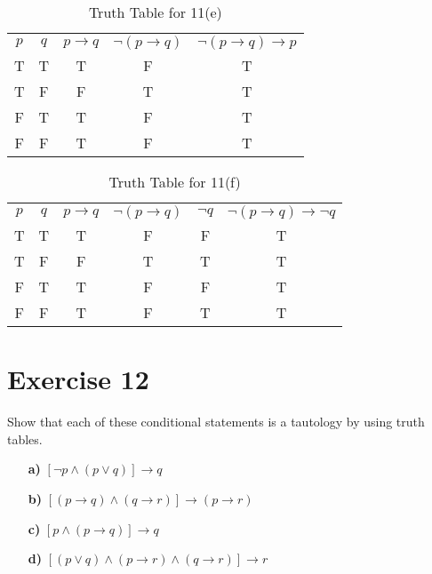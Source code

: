 \documentclass{Axon}
\begin{document}
\begin{table}[ht]
    \centering
    \begin{tabular}{c|c|c|c|c}
        \(p\) & \(q\) & \(p \to q\) & \(\lnot (p \to q)\) & \(\lnot (p \to q) \to p\) \\
        T     & T     & T           & F                   & T                         \\
        T     & F     & F           & T                   & T                         \\
        F     & T     & T           & F                   & T                         \\
        F     & F     & T           & F                   & T
    \end{tabular}
    \caption{Truth Table for 11(e)}
\end{table}

\begin{table}[ht]
    \centering
    \begin{tabular}{c|c|c|c|c|c}
        \(p\) & \(q\) & \(p \to q\) & \(\lnot(p \to q)\) & \(\lnot q\) & \(\lnot(p \to q) \to \lnot q\) \\
        T     & T     & T           & F                  & F           & T                              \\
        T     & F     & F           & T                  & T           & T                              \\
        F     & T     & T           & F                  & F           & T                              \\
        F     & F     & T           & F                  & T           & T
    \end{tabular}
    \caption{Truth Table for 11(f)}
\end{table}

\section*{Exercise 12}
Show that each of these conditional statements is a tautology by using truth tables.
\begin{enumerate}
    \item[\textbf{a)}] \([\lnot p \land (p \lor q)] \to q\)
    \item[\textbf{b)}] \([(p \to q) \land (q \to r)] \to (p \to r)\)
    \item[\textbf{c)}] \([p \land (p \to q)] \to q\)
    \item[\textbf{d)}] \([(p \lor q) \land (p \to r) \land (q \to r)] \to r\)
\end{enumerate}
\end{document}
